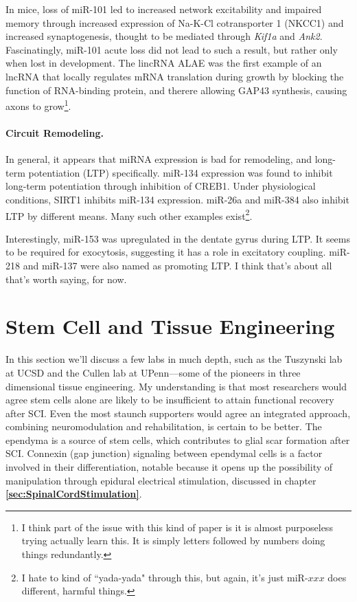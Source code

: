 \documentclass[12pt]{report}
\begin{document}
In mice, loss of miR-101 led to increased network excitability and impaired memory through increased expression of Na-K-Cl cotransporter 1 (NKCC1) and increased synaptogenesis, thought to be mediated through \textit{Kif1a} and \textit{Ank2}. Fascinatingly, miR-101 acute loss did not lead to such a result, but rather only when lost in development. The lincRNA ALAE was the first example of an lncRNA that locally regulates mRNA translation during growth by blocking the function of RNA-binding protein, and therere allowing GAP43 synthesis, causing axons to grow\footnote{I think part of the issue with this kind of paper is it is almost purposeless trying actually learn this. It is simply letters followed by numbers doing things redundantly.}.\newline

\subsubsection{Circuit Remodeling.}

In general, it appears that miRNA expression is bad for remodeling, and long-term potentiation (LTP) specifically. miR-134 expression was found to inhibit long-term potentiation through inhibition of CREB1. Under physiological conditions, SIRT1 inhibits miR-134 expression. miR-26a and miR-384 also inhibit LTP by different means. Many such other examples exist\footnote{I hate to kind of ``yada-yada" through this, but again, it's just miR-$xxx$ does different, harmful things.}.\newline

Interestingly, miR-153 was upregulated in the dentate gyrus during LTP. It seems to be required for exocytosis, suggesting it has a role in excitatory coupling. miR-218 and miR-137 were also named as promoting LTP. I think that's about all that's worth saying, for now. 









\chapter{Stem Cell and Tissue Engineering}

\label{sec:Stem-Cells}

In this section we'll discuss a few labs in much depth, such as the Tuszynski lab at UCSD and the Cullen lab at UPenn---some of the pioneers in three dimensional tissue engineering. My understanding is that most researchers would agree stem cells alone are likely to be insufficient to attain functional recovery after SCI. Even the most staunch supporters would agree an integrated approach, combining neuromodulation and rehabilitation, is certain to be better. The ependyma is a source of stem cells, which contributes to glial scar formation after SCI. Connexin (gap junction) signaling between ependymal cells is a factor involved in their differentiation, notable because it opens up the possibility of manipulation through epidural electrical stimulation, discussed in chapter \textbf{\ref{sec:SpinalCordStimulation}}.\newline
\end{document}

